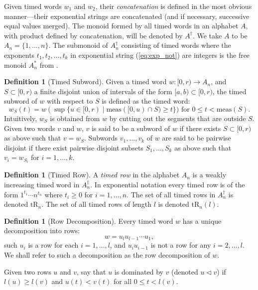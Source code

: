 \documentclass[10pt]{amsproc}
\theoremstyle{definition}
\newtheorem{definition}[theorem]{Definition}
\theoremstyle{remark}
\newcommand{\tr}{\mathrm{tR}}
\begin{document}
Given timed words $w_1$ and $w_2$, their \emph{concatenation} is defined in the most obvious manner---their exponential strings are concatenated (and if necessary, successive equal values merged).
The monoid formed by all timed words in an alphabet $A$, with product defined by concatenation, will be denoted by $A^\dagger$.
We take $A$ to be $A_n=\{1,\dotsc,n\}$.
The submonoid of $A_n^\dagger$ consisting of timed words where the exponents $t_1,t_2,\dotsc,t_k$ in exponential string (\ref{eq:exp_not}) are integers is the free monoid $A_n^*$ from \cite{Lascoux}.
\begin{definition}
  [Timed Subword]
  \label{definition:timed-subword}
  Given a timed word $w:[0,r)\to A_n$, and $S\subset [0,r)$ a finite disjoint union of intervals of the form $[a, b)\subset [0,r)$, the timed subword of $w$ with respect to $S$ is defined as the timed word:
  \begin{displaymath}
    w_S(t) = w(\sup\{u\in [0,r)\mid \mathrm{meas}([0,u)\cap S) \geq t\}) \text{ for } 0\leq t < \mathrm{meas}(S).
  \end{displaymath}
  Intuitively, $w_S$ is obtained from $w$ by cutting out the segments that are outside $S$.
  Given two words $v$ and $w$, $v$ is said to be a subword of $w$ if there exists $S\subset [0,r)$ as above such that $v=w_S$.
  Subwords $v_1,\dotsc,v_k$ of $w$ are said to be pairwise disjoint if there exist pairwise disjoint subsets $S_1,\dotsc,S_k$ as above such that $v_i=w_{S_i}$ for $i=1,\dotsc,k$.
\end{definition}
\begin{definition}[Timed Row]
A \emph{timed row} in the alphabet $A_n$ is a weakly increasing timed word in $A_n^\dagger$.
In exponential notation every timed row is of the form $1^{t_1}\dotsb n^{t_n}$ where $t_i\geq 0$ for $i=1,\dotsc,n$.
The set of all timed rows in $A_n^\dagger$ is denoted $\tr_n$.
The set of all timed rows of length $l$ is denoted $\tr_n(l)$.
\end{definition}
\begin{definition}[Row Decomposition]
Every timed word $w$ has a unique decomposition into rows:
\begin{displaymath}
  w = u_l u_{l-1}\dotsb u_1,
\end{displaymath}
such $u_i$ is a row for each $i=1,\dotsc,l$, and $u_iu_{i-1}$ is not a row for any $i=2,\dotsc,l$.
We shall refer to such a decomposition as the row decomposition of $w$.
\end{definition}
Given two rows $u$ and $v$, say that $u$ is dominated by $v$ (denoted $u\lhd v$) if $l(u)\geq l(v)$ and $u(t)<v(t)$ for all $0\leq t<l(v)$.
\end{document}
